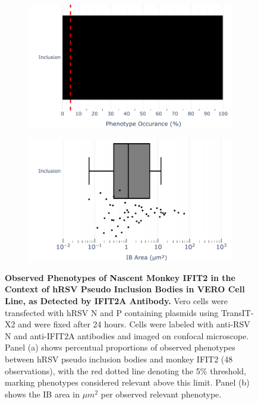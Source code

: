 \begin{figure}
    \begin{subfigure}{0.495\textwidth}
        \caption{}
        \includegraphics[width=1\linewidth]{08. Chapter 3/Figs/03. pIB/03. IFIT2/02. IFIT2A/04. bar_i2a_vero_hnhp.pdf} 
    \end{subfigure}
    \begin{subfigure}{0.495\textwidth}
        \caption{}
        \includegraphics[width=1\linewidth]{08. Chapter 3/Figs/03. pIB/03. IFIT2/02. IFIT2A/05. box_i2a_vero_hnhp.pdf}
    \end{subfigure}
    \caption[Observed Phenotypes of Nascent Monkey IFIT2 in the Context of hRSV Pseudo Inclusion Bodies in VERO Cell Line, as Detected by IFIT2A Antibody.]{\textbf{Observed Phenotypes of Nascent Monkey IFIT2 in the Context of hRSV Pseudo Inclusion Bodies in VERO Cell Line, as Detected by IFIT2A Antibody.} Vero cells were transfected with hRSV N and P containing plasmids using TransIT-X2 and were fixed after 24 hours. Cells were labeled with anti-RSV N and anti-IFIT2A antibodies and imaged on confocal microscope. Panel (a) shows percentual proportions of observed phenotypes between hRSV pseudo inclusion bodies and monkey IFIT2 (48 observations), with the red dotted line denoting the 5\% threshold, marking phenotypes considered relevant above this limit. Panel (b) shows the IB area in \(\mu m^2\) per observed relevant phenotype.}
    \label{fig:Observed Phenotypes of Nascent Monkey IFIT2 in the Context of hRSV Pseudo Inclusion Bodies in VERO Cell Line, as Detected by IFIT2A Antibody}
\end{figure}

